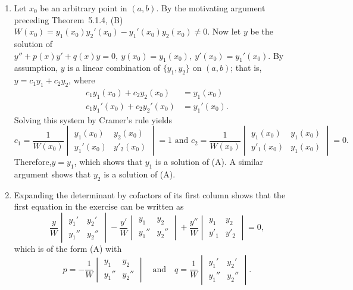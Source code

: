 \documentclass[openany]{book}
\newenvironment{sectionSolutions}{
 \begin{enumerate}[item-label={\thesection.\arabic{enumi}.}]
}{
 \end{enumerate}
}
\begin{document}
\begin{sectionSolutions}
\item
Let $x_0$ be an arbitrary point in  $(a,b)$. By the motivating
argument preceding  Theorem~5.1.4,
(B) $W(x_0)=y_1(x_0)y_2'(x_0)-y_1'(x_0)y_2(x_0)\ne0$. Now let $y$ be
the solution of $y''+p(x)y'+q(x)y=0,\ y(x_0)=y_1(x_0),\
y'(x_0)=y_1'(x_0)$. By assumption,  $y$ is a linear combination
of
 $\{y_1,y_2\}$ on  $(a,b)$; that is,  $y=c_1y_1+c_2y_2$, where
\begin{align*}
c_1y_1(x_0)+c_2y_2(x_0)&=y_1(x_0)\\
c_1y_1'(x_0)+c_2y_2'(x_0)&=y_1'(x_0).
\end{align*}
Solving this system by Cramer's rule yields
\[
c_1=\frac{1}{ W(x_0)}
\begin{vmatrix}
y_1(x_0) & y_2(x_0) \\
y_1'(x_0) & y'_2(x_0)
\end{vmatrix}=1
\text{ and }
c_2=\frac{1}{ W(x_0)}
\begin{vmatrix}
y_1(x_0) & y_1(x_0)\\
y'_1(x_0) &y_1(x_0)
\end{vmatrix}=0.
\]
Therefore,$y=y_1$, which
shows that $y_1$ is a solution of (A). A similar argument shows that
$y_2$ is a solution of (A).


\item
Expanding  the determinant by cofactors of its first column shows that
the first equation in the exercise can be written as
\[
\frac{y}{ W}\begin{vmatrix}
y_1' & y_2' \\
y_1'' & y_2''
\end{vmatrix}-
\frac{y'}{ W}\begin{vmatrix}
y_1 & y_2 \\
y_1'' & y_2''
\end{vmatrix}+
\frac{y''}{ W}\begin{vmatrix}
y_1 & y_2 \\
y'_1 & y'_2
\end{vmatrix}=0,
\]
which is of the form (A) with
\[
p=-\frac{1}{ W}\begin{vmatrix}
y_1 & y_2 \\
y_1'' & y_2''
\end{vmatrix}
\quad\text{and}\quad
q=\frac{1}{ W}\begin{vmatrix}
y_1' & y_2' \\
y_1'' & y_2''
\end{vmatrix}.
\]



\end{sectionSolutions}
\end{document}
